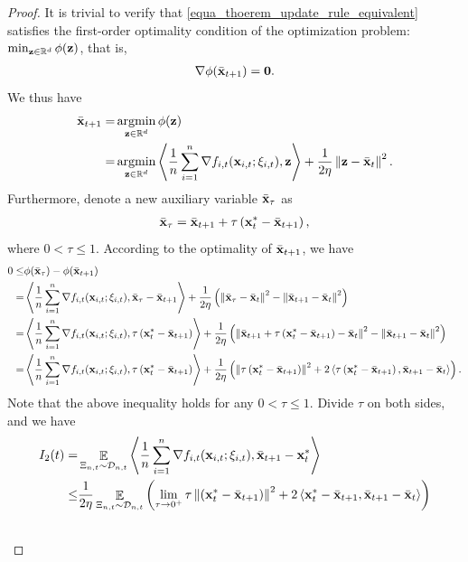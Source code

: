 \documentclass{article}
\begin{document}
\begin{proof}
It is trivial to verify that \eqref{equa_thoerem_update_rule_equivalent} satisfies the first-order optimality condition of the optimization problem: $\min_{{\bf z}\in\mathbb{R}^d} \phi({\bf z})$, that is,
\begin{align}
\nonumber
\nabla \phi(\bar{{\bf x}}_{t+1}) = {\bf 0}.
\end{align} We thus have 
\begin{align}
\nonumber
\bar{\x}_{t+1} = & \argmin_{\z\in\RR^d} \phi(\z) \\ \nonumber
= & \argmin_{\z\in\RR^d} \lrangle{\frac{1}{n}\sum_{i=1}^n \nabla f_{i,t}(\x_{i,t};\xi_{i,t}), \z} + \frac{1}{2\eta}\lrnorm{\z - \bar{\x}_t}^2.
\end{align} Furthermore, denote a new auxiliary variable $\bar{{\bf x}}_{\tau}$ as  
\begin{align}
\nonumber
\bar{{\bf x}}_{\tau} = \bar{{\bf x}}_{t+1} + \tau \left( {\bf x}_t^\ast - \bar{{\bf x}}_{t+1} \right),
\end{align} where $0< \tau \le 1$. According to the optimality of $\bar{{\bf x}}_{t+1}$, we have
\begin{align}
\nonumber
0 \le & \phi(\bar{{\bf x}}_{\tau}) - \phi(\bar{{\bf x}}_{t+1}) \\ \nonumber
= & \left\langle\frac{1}{n}\sum_{i=1}^n \nabla f_{i,t}({\bf x}_{i,t};\xi_{i,t}), \bar{{\bf x}}_{\tau} - \bar{{\bf x}}_{t+1} \right\rangle + \frac{1}{2\eta}\left(  \left\lVert\bar{{\bf x}}_{\tau} - \bar{{\bf x}}_t\right\rVert^2 - \left\lVert\bar{{\bf x}}_{t+1} - \bar{{\bf x}}_t\right\rVert^2  \right) \\ \nonumber
= & \left\langle\frac{1}{n}\sum_{i=1}^n \nabla f_{i,t}({\bf x}_{i,t};\xi_{i,t}), \tau \left( {\bf x}_t^\ast - \bar{{\bf x}}_{t+1} \right) \right\rangle + \frac{1}{2\eta}\left(  \left\lVert\bar{{\bf x}}_{t+1} + \tau \left( {\bf x}_t^\ast - \bar{{\bf x}}_{t+1} \right) - \bar{{\bf x}}_t\right\rVert^2 - \left\lVert\bar{{\bf x}}_{t+1} - \bar{{\bf x}}_t\right\rVert^2  \right) \\ \nonumber
= & \left\langle\frac{1}{n}\sum_{i=1}^n \nabla f_{i,t}({\bf x}_{i,t};\xi_{i,t}), \tau \left( {\bf x}_t^\ast - \bar{{\bf x}}_{t+1} \right) \right\rangle + \frac{1}{2\eta}\left(  \left\lVert\tau \left( {\bf x}_t^\ast - \bar{{\bf x}}_{t+1} \right)\right\rVert^2 + 2\left\langle\tau \left( {\bf x}_t^\ast - \bar{{\bf x}}_{t+1} \right), \bar{{\bf x}}_{t+1} - \bar{{\bf x}}_t  \right\rangle  \right).
\end{align} Note that the above inequality holds for any $0< \tau \le 1$. Divide $\tau$ on both sides, and we have
\begin{align}
\nonumber
I_2(t) = & \EE_{ \Xi_{n,t} \sim \Dcal_{n,t} } \lrangle{\frac{1}{n}\sum_{i=1}^n \nabla f_{i,t}(\x_{i,t};\xi_{i,t}), \bar{\x}_{t+1} - \x_t^\ast} \\ \nonumber 
\le & \frac{1}{2\eta}\EE_{ \Xi_{n,t} \sim \Dcal_{n,t} }\lrincir{ \lim_{\tau \rightarrow 0^+}\tau \lrnorm{\lrincir{\x_t^\ast - \bar{\x}_{t+1}}}^2 + 2\lrangle{ \x_t^\ast - \bar{\x}_{t+1}, \bar{\x}_{t+1} - \bar{\x}_t } } \\ \nonumber

\end{align}
\end{proof}
\end{document}
